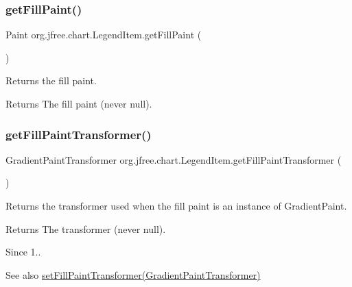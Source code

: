 \subsubsection{\texorpdfstring{get\+Fill\+Paint()}{getFillPaint()}}
{\footnotesize\ttfamily Paint org.\+jfree.\+chart.\+Legend\+Item.\+get\+Fill\+Paint (\begin{DoxyParamCaption}{ }\end{DoxyParamCaption})}

Returns the fill paint.

\begin{DoxyReturn}{Returns}
The fill paint (never {\ttfamily null}). 
\end{DoxyReturn}
\mbox{\label{classorg_1_1jfree_1_1chart_1_1_legend_item_a813bf6cb2c706b32c286722575d92d40}} 
\subsubsection{\texorpdfstring{get\+Fill\+Paint\+Transformer()}{getFillPaintTransformer()}}
{\footnotesize\ttfamily Gradient\+Paint\+Transformer org.\+jfree.\+chart.\+Legend\+Item.\+get\+Fill\+Paint\+Transformer (\begin{DoxyParamCaption}{ }\end{DoxyParamCaption})}

Returns the transformer used when the fill paint is an instance of {\ttfamily Gradient\+Paint}.

\begin{DoxyReturn}{Returns}
The transformer (never {\ttfamily null}).
\end{DoxyReturn}
\begin{DoxySince}{Since}
1..
\end{DoxySince}
\begin{DoxySeeAlso}{See also}
\mbox{\hyperlink{classorg_1_1jfree_1_1chart_1_1_legend_item_a305f0ef5afe94be43e8eb6bf00a85366}{set\+Fill\+Paint\+Transformer(\+Gradient\+Paint\+Transformer)}} 
\end{DoxySeeAlso}
\mbox{\label{classorg_1_1jfree_1_1chart_1_1_legend_item_a6a470d7f80ace9fbbedbb75af678f84c}} 
